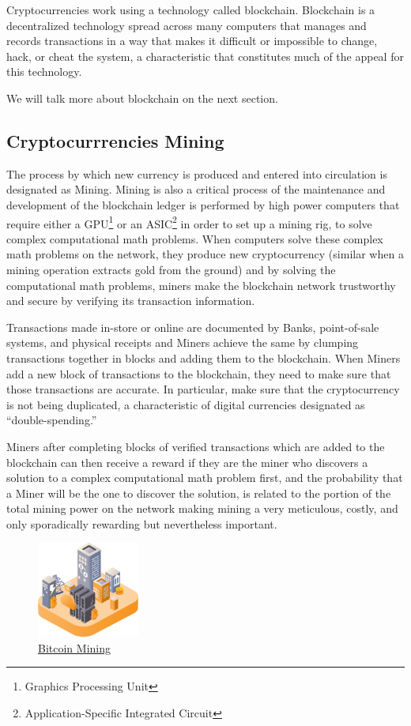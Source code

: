 \documentclass{article}
\newcommand\tab[1][1cm]{\hspace*{#1}}
\begin{document}
\tab Cryptocurrencies work using a technology called blockchain. Blockchain is a decentralized technology spread across many computers that manages and records transactions in a way that makes it difficult or impossible to change, hack, or cheat the system, a characteristic that constitutes much of the appeal for this technology.

We will talk more about blockchain on the next section.

\subsection{Cryptocurrrencies Mining}

\tab The process by which new currency is produced and entered into circulation is designated as Mining. Mining is also a critical process of the maintenance and development of the blockchain ledger is performed by high power computers that require either a GPU\footnote{Graphics Processing Unit} or an ASIC\footnote{Application-Specific Integrated Circuit} in order to set up a mining rig, to solve complex computational math problems. When computers solve these complex math problems on the network, they produce new cryptocurrency (similar  when a mining operation extracts gold from the ground) and by solving the computational math problems, miners make the blockchain network trustworthy and secure by verifying its transaction information. 

Transactions made in-store or online are documented by Banks, point-of-sale systems, and physical receipts and Miners achieve the same by clumping transactions together in blocks and adding them to the blockchain. When Miners add a new block of transactions to the blockchain, they need to make sure that those transactions are accurate. In particular, make sure that the cryptocurrency is not being duplicated, a characteristic of  digital currencies designated as “double-spending.”

Miners after completing blocks of verified transactions which are added to the blockchain can then receive a reward if they are the miner who discovers a solution to a complex computational math problem first, and the probability that a Miner will be the one to discover the solution, is related to the portion of the total mining power on the network making mining a very meticulous, costly, and only sporadically rewarding but nevertheless important.

\begin{figure}[H]
    \begin{center}
        \includegraphics[width=0.3\textwidth]{images/bitcoin_mining.png}
        \caption{\href{https://miro.medium.com/max/366/0*hSBQbC__jrcu2jeg}{\underline{Bitcoin Mining}}}
    \end{center}
\end{figure}
\end{document}
